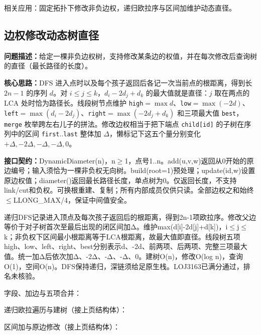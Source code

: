 \noindent 相关应用：固定拓扑下修改非负边权，递归欧拉序与区间加维护动态直径。

\subsection{边权修改动态树直径}\label{compact-DynamicDiameter}

\noindent\textbf{问题描述：}\allowbreak 给定一棵非负边权树，支持修改某条边的权值，并在每次修改后查询树的直径（最长路径的长度）。

\textbf{核心思路：}\allowbreak DFS 进入点时以及每个孩子返回后各记一次当前点的根距离，得到长 $2n-1$ 的序列 $d$。对 $i\le j\le k$，$d_i-2d_j+d_k$ 的最大值就是直径：$j$ 取在两点的 LCA 处时恰为路径长。线段树节点维护 \texttt{high}$=\max d$、\texttt{low}$=\max(-2d)$、\texttt{left}$=\max(d_i-2d_j)$、\texttt{right}$=\max(-2d_j+d_k)$ 和三项最大值 \texttt{best}，\texttt{merge} 枚举跨左右儿子的拼法。修改边权相当于把下端点 \texttt{child[id]} 的子树在序列中的区间 \texttt{first}..\texttt{last} 整体加 $\Delta$，懒标记下这五个量分别变化 $+\Delta,-2\Delta,-\Delta,-\Delta,0$。



{\sloppy{}\noindent\textbf{接口契约：}DynamicDiameter(n)，n$\ge$1，点号1..n。add(u,v,w)返回从0开始的原边编号；输入须恰为一棵非负权无向树。build(root=1)预处理；update(id,w)设置原边权值；diameter()返回最长路径长度，单点树为0。仅返回长度，不支持link/cut和负权。可换根重建、复制；所有内部成员仅供只读。全部边权之和始终$\le$LLONG\_MAX/4，保证中间值安全。

递归DFS记录进入顶点及每次孩子返回后的根距离，得到2n-1项欧拉序。修改父边等价于对子树首次至最后出现的闭区间加Δ。维护max(d[i]-2d[j]+d[k])，i$\le$j$\le$k；非负权下区间最小根距离等于LCA根距离，故最大值即直径。线段树五项high、low、left、right、best分别表示d、-2d、前两项、后两项、完整三项最大值。统一加Δ后依次加Δ、-2Δ、-Δ、-Δ、0。建树O(n)，修改O(log n)，查询O(1)，空间O(n)。DFS保持递归，深链须给足原生栈。LOJ3163已满分通过，排名未核验。\par}

\newpage\noindent 字段、加边与五项合并：



\newpage\noindent 递归欧拉遍历与建树（接上页结构体）：



\newpage\noindent 区间加与原边修改（接上页结构体）：

